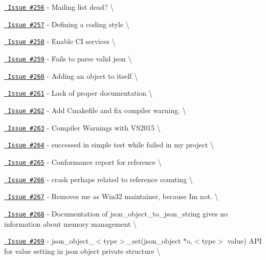 \begin{DoxyItemize}
\item \href{https://github.com/json-c/json-c/issues/256}{\texttt{ Issue \#256}} -\/ Mailing list dead? \textbackslash{}
\item \href{https://github.com/json-c/json-c/issues/257}{\texttt{ Issue \#257}} -\/ Defining a coding style \textbackslash{}
\item \href{https://github.com/json-c/json-c/issues/258}{\texttt{ Issue \#258}} -\/ Enable CI services \textbackslash{}
\item \href{https://github.com/json-c/json-c/issues/259}{\texttt{ Issue \#259}} -\/ Fails to parse valid json \textbackslash{}
\item \href{https://github.com/json-c/json-c/issues/260}{\texttt{ Issue \#260}} -\/ Adding an object to itself \textbackslash{}
\item \href{https://github.com/json-c/json-c/issues/261}{\texttt{ Issue \#261}} -\/ Lack of proper documentation \textbackslash{}
\item \href{https://github.com/json-c/json-c/issues/262}{\texttt{ Issue \#262}} -\/ Add Cmakefile and fix compiler warning. \textbackslash{}
\item \href{https://github.com/json-c/json-c/issues/263}{\texttt{ Issue \#263}} -\/ Compiler Warnings with VS2015 \textbackslash{}
\item \href{https://github.com/json-c/json-c/issues/264}{\texttt{ Issue \#264}} -\/ successed in simple test while failed in my project \textbackslash{}
\item \href{https://github.com/json-c/json-c/issues/265}{\texttt{ Issue \#265}} -\/ Conformance report for reference \textbackslash{}
\item \href{https://github.com/json-c/json-c/issues/266}{\texttt{ Issue \#266}} -\/ crash perhaps related to reference counting \textbackslash{}
\item \href{https://github.com/json-c/json-c/issues/267}{\texttt{ Issue \#267}} -\/ Removes me as Win32 maintainer, because I\textquotesingle{}m not. \textbackslash{}
\item \href{https://github.com/json-c/json-c/issues/268}{\texttt{ Issue \#268}} -\/ Documentation of json\+\_\+object\+\_\+to\+\_\+json\+\_\+string gives no information about memory management \textbackslash{}
\item \href{https://github.com/json-c/json-c/issues/269}{\texttt{ Issue \#269}} -\/ json\+\_\+object\+\_\+$<$type$>$\+\_\+set(json\+\_\+object $\ast$o,$<$type$>$ value) API for value setting in json object private structure \textbackslash{}

\end{DoxyItemize}
